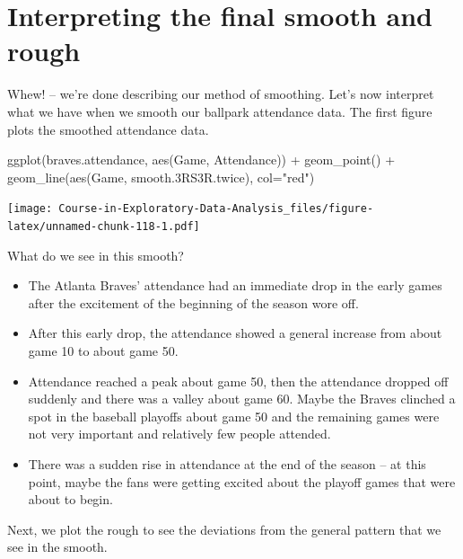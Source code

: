 \documentclass[
]{book}
\newenvironment{Shaded}{\begin{snugshade}}{\end{snugshade}}
\newcommand{\AttributeTok}[1]{\textcolor[rgb]{0.77,0.63,0.00}{#1}}
\newcommand{\FloatTok}[1]{\textcolor[rgb]{0.00,0.00,0.81}{#1}}
\newcommand{\FunctionTok}[1]{\textcolor[rgb]{0.00,0.00,0.00}{#1}}
\newcommand{\NormalTok}[1]{#1}
\newcommand{\SpecialCharTok}[1]{\textcolor[rgb]{0.00,0.00,0.00}{#1}}
\newcommand{\StringTok}[1]{\textcolor[rgb]{0.31,0.60,0.02}{#1}}
\providecommand{\tightlist}{%
  \setlength{\itemsep}{0pt}\setlength{\parskip}{0pt}}
\begin{document}
\hypertarget{interpreting-the-final-smooth-and-rough}{%
\section{Interpreting the final smooth and rough}\label{interpreting-the-final-smooth-and-rough}}

Whew! -- we're done describing our method of smoothing. Let's now interpret what we have when we smooth our ballpark attendance data. The first figure plots the smoothed attendance data.

\begin{Shaded}
\begin{Highlighting}[]
\FunctionTok{ggplot}\NormalTok{(braves.attendance, }\FunctionTok{aes}\NormalTok{(Game, Attendance)) }\SpecialCharTok{+}
  \FunctionTok{geom\_point}\NormalTok{() }\SpecialCharTok{+}
  \FunctionTok{geom\_line}\NormalTok{(}\FunctionTok{aes}\NormalTok{(Game, smooth}\FloatTok{.3}\NormalTok{RS3R.twice), }\AttributeTok{col=}\StringTok{"red"}\NormalTok{)}
\end{Highlighting}
\end{Shaded}

\texttt{[image: Course-in-Exploratory-Data-Analysis\_files/figure-latex/unnamed-chunk-118-1.pdf]}

What do we see in this smooth?

\begin{itemize}
\tightlist
\item
  The Atlanta Braves' attendance had an immediate drop in the early games after the excitement of the beginning of the season wore off.
\item
  After this early drop, the attendance showed a general increase from about game 10 to about game 50.
\item
  Attendance reached a peak about game 50, then the attendance dropped off suddenly and there was a valley about game 60. Maybe the Braves clinched a spot in the baseball playoffs about game 50 and the remaining games were not very important and relatively few people attended.
\item
  There was a sudden rise in attendance at the end of the season -- at this point, maybe the fans were getting excited about the playoff games that were about to begin.
\end{itemize}

Next, we plot the rough to see the deviations from the general pattern that we see in the smooth.
\end{document}
